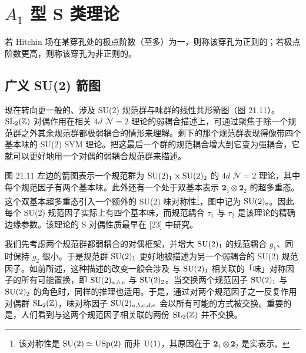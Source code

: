 
\section{$A_1$ 型 S 类理论}

\begin{definition}[21.24] 若 Hitchin 场在某穿孔处的极点阶数（至多）为一，则称该穿孔为正则的；若极点阶数更高，则称该穿孔为非正则的。
\end{definition}

\subsection{广义 SU(2) 箭图}

现在转向更一般的、涉及 SU(2) 规范群与味群的线性共形箭图（图 21.11）。$\operatorname{SL}_2(\mathbb{Z})$ 对偶作用在相关 $4d$ $\mathcal{N}=2$ 理论的弱耦合描述上，可通过聚焦于除一个规范群之外其余规范群都极弱耦合的情形来理解。剩下的那个规范群表现得像带四个基本味的 SU(2) SYM 理论。把这最后一个群的规范耦合增大到它变为强耦合，它就可以更好地用一个对偶的弱耦合规范群来描述。


图 21.11 左边的箭图表示一个规范群为 $\operatorname{SU}(2)_1\times\operatorname{SU}(2)_2$ 的 $4d$ $\mathcal{N}=2$ 理论，其中每个规范因子有两个基本味。此外还有一个处于双基本表示 $\mathbf{2}_1\otimes\mathbf{2}_2$ 的超多重态。这个双基本超多重态引入一个额外的 SU(2) 味对称性\footnote{该对称性是 $\operatorname{SU}(2)\simeq\mathrm{USp}(2)$ 而非 $\operatorname{U}(1)$，其原因在于 $\mathbf{2}_1\otimes\mathbf{2}_2$ 是实表示。}，图中记为 $\operatorname{SU}(2)_e$。因此每个 SU(2) 规范因子实际上有四个基本味，而规范耦合 $\tau_1$ 与 $\tau_2$ 是该理论的精确边缘参数。该理论的 S 对偶性质最早在 [23] 中研究。

我们先考虑两个规范群都弱耦合的对偶框架，并增大 $\operatorname{SU}(2)_1$ 的规范耦合 $g_1$、同时保持 $g_2$ 很小。于是规范群 $\operatorname{SU}(2)_1$ 更好地被描述为另一个弱耦合的 SU(2) 规范因子。如前所述，这种描述的改变一般会涉及
与 $\operatorname{SU}(2)_1$ 相关联的「味」对称因子的所有可能置换，即 $\operatorname{SU}(2)_{a,b,e}$ 与 $\operatorname{SU}(2)_2$。当交换两个规范因子 $\operatorname{SU}(2)_1$ 与 $\operatorname{SU}(2)_2$ 的角色时，同样的推理也适用。于是，通过对两个规范因子之一反复作用对偶群 $\operatorname{SL}_2(\mathbb{Z})$，味对称因子 $\operatorname{SU}(2)_{a,b,c,d,e}$ 会以所有可能的方式被交换。重要的是，人们看到与这两个规范因子相关联的两份 $\operatorname{SL}_2(\mathbb{Z})$ 并不交换。

